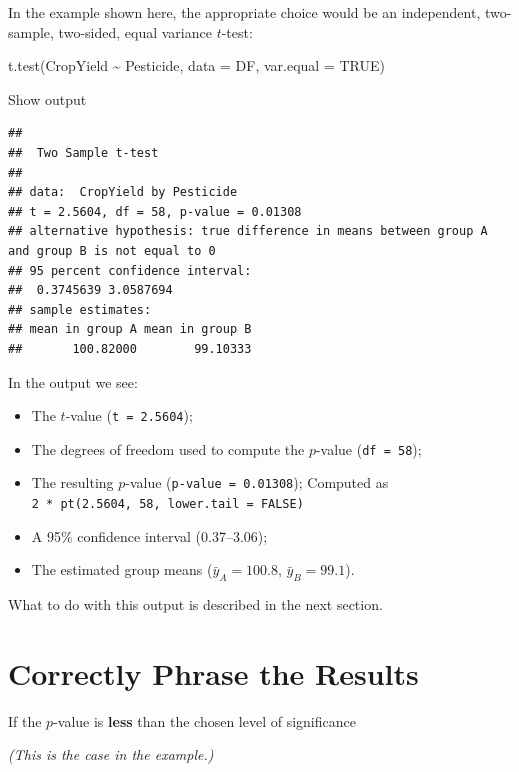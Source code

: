 \documentclass[
]{book}
\newenvironment{Shaded}{\begin{snugshade}}{\end{snugshade}}
\newcommand{\AttributeTok}[1]{\textcolor[rgb]{0.77,0.63,0.00}{#1}}
\newcommand{\ConstantTok}[1]{\textcolor[rgb]{0.00,0.00,0.00}{#1}}
\newcommand{\FunctionTok}[1]{\textcolor[rgb]{0.00,0.00,0.00}{#1}}
\newcommand{\NormalTok}[1]{#1}
\newcommand{\SpecialCharTok}[1]{\textcolor[rgb]{0.00,0.00,0.00}{#1}}
\providecommand{\tightlist}{%
  \setlength{\itemsep}{0pt}\setlength{\parskip}{0pt}}
\begin{document}
In the example shown here, the appropriate choice would be an independent, two-sample, two-sided, equal variance \(t\)-test:

\begin{Shaded}
\begin{Highlighting}[]
\FunctionTok{t.test}\NormalTok{(CropYield }\SpecialCharTok{\textasciitilde{}}\NormalTok{ Pesticide, }\AttributeTok{data =}\NormalTok{ DF, }\AttributeTok{var.equal =} \ConstantTok{TRUE}\NormalTok{)}
\end{Highlighting}
\end{Shaded}

Show output

\begin{verbatim}
## 
##  Two Sample t-test
## 
## data:  CropYield by Pesticide
## t = 2.5604, df = 58, p-value = 0.01308
## alternative hypothesis: true difference in means between group A and group B is not equal to 0
## 95 percent confidence interval:
##  0.3745639 3.0587694
## sample estimates:
## mean in group A mean in group B 
##       100.82000        99.10333
\end{verbatim}

In the output we see:

\begin{itemize}
\tightlist
\item
  The \(t\)-value (\texttt{t\ =\ 2.5604});
\item
  The degrees of freedom used to compute the \(p\)-value (\texttt{df\ =\ 58});
\item
  The resulting \(p\)-value (\texttt{p-value\ =\ 0.01308}); Computed as \texttt{2\ *\ pt(2.5604,\ 58,\ lower.tail\ =\ FALSE)}
\item
  A 95\% confidence interval (0.37--3.06);
\item
  The estimated group means (\(\bar{y}_A = 100.8\), \(\bar{y}_B = 99.1\)).
\end{itemize}

What to do with this output is described in the next section.

\hypertarget{results-t}{%
\section{Correctly Phrase the Results}\label{results-t}}

If the \(p\)-value is \textbf{less} than the chosen level of significance

\emph{(This is the case in the example.)}
\end{document}
